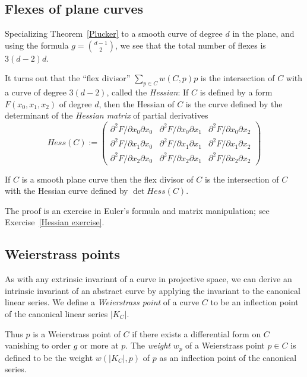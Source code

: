 \subsection{Flexes of plane curves}\label{plane curve pluecker}

Specializing Theorem~\ref{Plucker} to a smooth curve of degree $d$ in the plane, and using the formula
$g= {d-1\choose 2}$, we see that the total number of flexes is $3(d-2)d$. 

It turns out that the ``flex divisor''
$\sum_{p\in C} w(C, p)p$
is the intersection of $C$ with a curve of degree $3(d-2)$, called the \emph{Hessian}: If $C$ is defined by a form $F(x_0, x_1, x_2)$ of degree $d$, then
the Hessian of $C$ is the curve defined by the determinant of the \emph{Hessian matrix} of partial derivatives
$$
Hess(C) :=
\begin{pmatrix}
 \partial^2 F/\partial x_0 \partial x_0 & \partial^2 F/\partial x_0 \partial x_1 & \partial^2 F/\partial x_0 \partial x_2 \\
\partial^2 F/\partial x_1 \partial x_0 & \partial^2 F/\partial x_1 \partial x_1 & \partial^2 F/\partial x_1 \partial x_2 \\
\partial^2 F/\partial x_2 \partial x_0 & \partial^2 F/\partial x_2 \partial x_1 & \partial^2 F/\partial x_2 \partial x_2 
\end{pmatrix}
$$
\begin{theorem}\label{Hessian} If $C$ is a smooth plane curve then the flex divisor of $C$ is the intersection 
of $C$ with the Hessian curve defined by $\det Hess(C)$.
\end{theorem}
The proof is an exercise in Euler's formula and matrix manipulation; see Exercise~\ref{Hessian exercise}.

\subsection{Weierstrass points}\label{Weierstrass points}

As with any extrinsic invariant of a curve in projective space, we can derive an intrinsic invariant of an abstract curve by applying the invariant to the canonical linear series. We define a \emph{Weierstrass point} of a curve $C$ to be an inflection point of the canonical linear series $|K_C|$. 

Thus $p$ is a Weierstrass point of $C$ if there exists a  differential form on $C$ vanishing to order $g$ or more at $p$. The \emph{weight} $w_p$ of a Weierstrass point $p \in C$  is defined to be the weight $w(|K_C|,p)$ of $p$ as an inflection point of the canonical series. 

